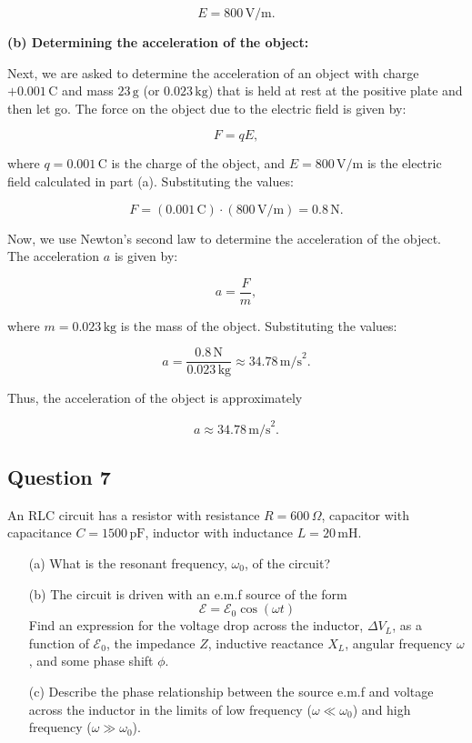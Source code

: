 \documentclass{article}
\begin{document}
\[
E = 800 \, \text{V/m}.
\]

\textbf{(b) Determining the acceleration of the object:}

Next, we are asked to determine the acceleration of an object with charge $+0.001 \, \text{C}$ and mass $23 \, \text{g}$ (or $0.023 \, \text{kg}$) that is held at rest at the positive plate and then let go. The force on the object due to the electric field is given by:

\[
F = qE,
\]

where $q = 0.001 \, \text{C}$ is the charge of the object, and $E = 800 \, \text{V/m}$ is the electric field calculated in part (a). Substituting the values:

\[
F = (0.001 \, \text{C}) \cdot (800 \, \text{V/m}) = 0.8 \, \text{N}.
\]

Now, we use Newton's second law to determine the acceleration of the object. The acceleration $a$ is given by:

\[
a = \frac{F}{m},
\]

where $m = 0.023 \, \text{kg}$ is the mass of the object. Substituting the values:

\[
a = \frac{0.8 \, \text{N}}{0.023 \, \text{kg}} \approx 34.78 \, \text{m/s}^2.
\]

Thus, the acceleration of the object is approximately

\[
a \approx 34.78 \, \text{m/s}^2.
\]


\subsection{Question 7}
An RLC circuit has a resistor with resistance $R = 600\,\Omega$, capacitor with capacitance $C = 1500\,\mathrm{pF}$, inductor with inductance $L = 20\,\mathrm{mH}$.  

\begin{enumerate}
    \item[(a)] What is the resonant frequency, $\omega_0$, of the circuit?  

    \item[(b)] The circuit is driven with an e.m.f source of the form  
    \[
    \mathcal{E} = \mathcal{E}_0 \cos(\omega t)
    \]  
    Find an expression for the voltage drop across the inductor, $\Delta V_L$, as a function of $\mathcal{E}_0$, the impedance $Z$, inductive reactance $X_L$, angular frequency $\omega$, and some phase shift $\phi$.  

    \item[(c)] Describe the phase relationship between the source e.m.f and voltage across the inductor in the limits of low frequency ($\omega \ll \omega_0$) and high frequency ($\omega \gg \omega_0$).
\end{enumerate}
\end{document}
